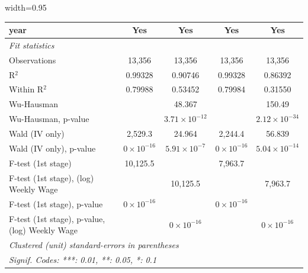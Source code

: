 \documentclass[
  10pt,
]{article}
\begin{document}
\begin{table}[htbp]
\begin{adjustbox}{width=0.95\textheight}
\begin{tabular}{lcccc}
         year                                           & Yes                 & Yes                    & Yes                 & Yes\\  
         \midrule
         \emph{Fit statistics}\\
         Observations                                   & 13,356              & 13,356                 & 13,356              & 13,356\\  
         R$^2$                                          & 0.99328             & 0.90746                & 0.99328             & 0.86392\\  
         Within R$^2$                                   & 0.79988             & 0.53452                & 0.79984             & 0.31550\\  
         Wu-Hausman                                     &                     & 48.367                 &                     & 150.49\\  
         Wu-Hausman, p-value                            &                     & $3.71\times 10^{-12}$  &                     & $2.12\times 10^{-34}$\\   
         Wald (IV only)                                 & 2,529.3             & 24.964                 & 2,244.4             & 56.839\\  
         Wald (IV only), p-value                        & $0\times 10^{-16}$  & $5.91\times 10^{-7}$   & $0\times 10^{-16}$  & $5.04\times 10^{-14}$\\   
         F-test (1st stage)                             & 10,125.5            &                        & 7,963.7             & \\  
         F-test (1st stage), (log) Weekly Wage          &                     & 10,125.5               &                     & 7,963.7\\  
         F-test (1st stage), p-value                    & $0\times 10^{-16}$  &                        & $0\times 10^{-16}$  & \\  
         F-test (1st stage), p-value, (log) Weekly Wage &                     & $0\times 10^{-16}$     &                     & $0\times 10^{-16}$\\   
         \midrule \midrule
         \multicolumn{5}{l}{\emph{Clustered (unit) standard-errors in parentheses}}\\
         \multicolumn{5}{l}{\emph{Signif. Codes: ***: 0.01, **: 0.05, *: 0.1}}\\
      \end{tabular}
   \end{adjustbox}
\end{table}
\end{document}
